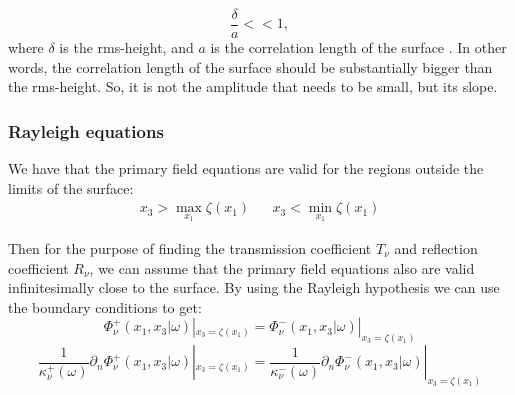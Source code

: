 \documentclass[../main.tex]{subfiles}
\begin{document}
\begin{equation}
    \frac{\delta}{a} << 1,
\end{equation}
where $\delta$ is the rms-height, and $a$ is the correlation length of the surface \cite{Simonsen2010}. In other words, the correlation length of the surface should be substantially bigger than the rms-height. So, it is not the amplitude that needs to be small, but its slope. 

\subsubsection{Rayleigh equations}
We have that the primary field equations are valid for the regions outside the limits of the surface:
\begin{align*}
    x_3 > \max_{x_1}\zeta(x_1) && x_3 < \min_{x_1}\zeta(x_1) 
\end{align*} 


Then for the purpose of finding the transmission coefficient $T_{\nu}$ and reflection coefficient $R_{\nu}$, we can assume that the primary field equations also are valid infinitesimally close to the surface. By using the Rayleigh hypothesis we can use the boundary conditions to get: 
\begin{equation}
    \Phi_{\nu}^+\left(x_1, x_3|\omega \right) |_{x_3=\zeta(x_1)} = \Phi_{\nu}^-\left(x_1, x_3|\omega \right) |_{x_3=\zeta(x_1)}
\label{cont_primary_field}
\end{equation}
\begin{equation*}
    \frac{1}{\kappa_{\nu}^+(\omega)}\partial_n\Phi_{\nu}^+\left(x_1, x_3|\omega \right) |_{x_3=\zeta(x_1)} = \frac{1}{\kappa_{\nu}^-(\omega)}\partial_n\Phi_{\nu}^-\left(x_1, x_3|\omega \right) |_{x_3=\zeta(x_1)}
\end{equation*}
\end{document}
